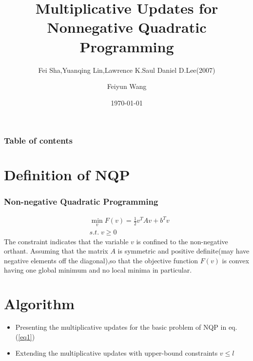 \documentclass{beamer}
\begin{document}
\title{Multiplicative Updates for Nonnegative Quadratic Programming}
\subtitle{Fei Sha,Yuanqing Lin,Lawrence K.Saul Daniel D.Lee(2007)}
\author{Feiyun Wang}
\date{\today}

\begin{frame}
\titlepage
\end{frame}


\begin{frame}\frametitle{Table of contents}\tableofcontents
\end{frame}


\section{Definition of NQP}
\begin{frame}\frametitle{Non-negative Quadratic Programming}
\begin{equation}\label{eq1}
\begin{split}
&\min_v F(v)=\frac{1}{2}v^TAv+b^Tv\\
& s.t. \;  v\geq 0
\end{split}
\end{equation}
The constraint indicates that the variable $v$ is confined to the non-negative orthant. Assuming that the matrix $A$ is symmetric and positive definite(may have negative elements off the diagonal),so that the objective function $F(v)$ is convex having one global minimum and no local minima in particular.
\end{frame}


\section{Algorithm}
\begin{frame}
\begin{itemize}
\item Presenting the multiplicative updates for the basic problem of NQP in eq.(\ref{eq1})
\item Extending the multiplicative updates with upper-bound constraints $v\leq l$
\end{itemize}
\end{frame}
\end{document}
